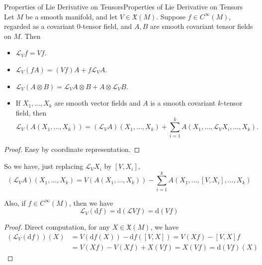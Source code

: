 \documentclass[../main.tex]{subfiles}
\begin{document}
\begin{proposition}{Properties of Lie Derivative on Tensors}{Properties of Lie Derivative on Tensors}
  Let $M$ be a smooth manifold, and let $V\in \mathfrak{X}(M)$. Suppose $f\in C^\infty(M)$, regarded as a covariant $0$-tensor field, and $A, B$ are smooth covariant tensor fields on $M$. Then
  \begin{itemize}
    \item $\mathcal{L}_V f = V f$.
    \item $\mathcal{L}_V (f A) = (V f) A + f \mathcal{L}_V A$.
    \item $\mathcal{L}_V (A \otimes B) = \mathcal{L}_V A \otimes B + A \otimes \mathcal{L}_V B$.
    \item If $X_1, \ldots ,X_k$ are smooth vector fields and $A$ is a smooth covariant $k$-tensor field, then
      \begin{equation*}
        \mathcal{L}_V (A (X_1, \ldots ,X_k)) = (\mathcal{L}_V A)(X_1, \ldots ,X_k) + \sum_{i = 1}^k A(X_1, \ldots ,\mathcal{L}_V X_i, \ldots ,X_k).
      \end{equation*}
  \end{itemize}
\end{proposition}
\begin{proof}
  Easy by coordinate representation.
\end{proof}

So we have, just replacing $\mathcal{L}_V X_i$ by $[V, X_i]$, 
\begin{equation*}
  (\mathcal{L}_V A)(X_1, \ldots ,X_k) = V (A(X_1, \ldots ,X_k)) - \sum_{i = 1}^k A(X_1, \ldots ,[V, X_i], \ldots ,X_k)
\end{equation*}

Also, if $f\in C^\infty(M)$, then we have
\begin{equation}
  \mathcal{L}_V(\mathrm{d} f) = \mathrm{d} (\mathcal{L}V f) = \mathrm{d} (V f)
\end{equation}
\begin{proof}
Direct computation, for any $X\in \mathfrak{X}(M)$, we have
\begin{equation*}
  \begin{aligned}
    (\mathcal{L}_V(\mathrm{d} f))(X) &= V (\mathrm{d} f(X)) - \mathrm{d} f([V, X]) = V (X f) - [V, X] f\\
    &= V (X f) - V(X f) + X(V f) = X(V f) = \mathrm{d} (V f)(X)
  \end{aligned}
\end{equation*}
\end{proof}
\end{document}

